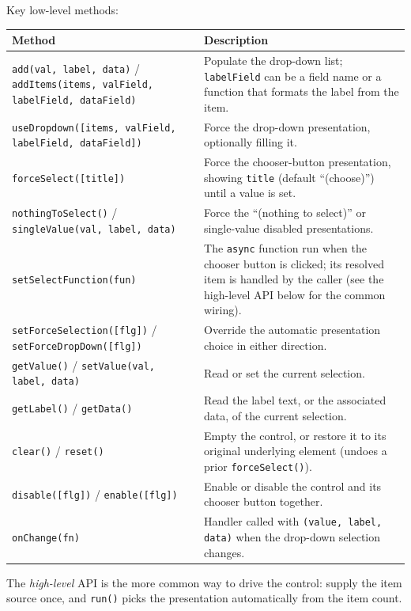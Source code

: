 \noindent
Key low-level methods:

\begin{longtable}{P{4.8cm}P{5.7cm}}
\toprule
\textbf{Method} & \textbf{Description} \\
\midrule
\endhead
\texttt{add(val, label, data)} / \texttt{addItems(items, valField, labelField, dataField)} & Populate the drop-down list; \texttt{labelField} can be a field name or a function that formats the label from the item. \\
\texttt{useDropdown([items, valField, labelField, dataField])} & Force the drop-down presentation, optionally filling it. \\
\texttt{forceSelect([title])} & Force the chooser-button presentation, showing \texttt{title} (default ``(choose)'') until a value is set. \\
\texttt{nothingToSelect()} / \texttt{singleValue(val, label, data)} & Force the ``(nothing to select)'' or single-value disabled presentations. \\
\texttt{setSelectFunction(fun)} & The \texttt{async} function run when the chooser button is clicked; its resolved item is handled by the caller (see the high-level API below for the common wiring). \\
\texttt{setForceSelection([flg])} / \texttt{setForceDropDown([flg])} & Override the automatic presentation choice in either direction. \\
\texttt{getValue()} / \texttt{setValue(val, label, data)} & Read or set the current selection. \\
\texttt{getLabel()} / \texttt{getData()} & Read the label text, or the associated data, of the current selection. \\
\texttt{clear()} / \texttt{reset()} & Empty the control, or restore it to its original underlying element (undoes a prior \texttt{forceSelect()}). \\
\texttt{disable([flg])} / \texttt{enable([flg])} & Enable or disable the control and its chooser button together. \\
\texttt{onChange(fn)} & Handler called with \texttt{(value, label, data)} when the drop-down selection changes. \\
\bottomrule
\end{longtable}

\noindent
The \emph{high-level} API is the more common way to drive the control: supply the item source once, and \texttt{run()} picks the presentation automatically from the item count.

